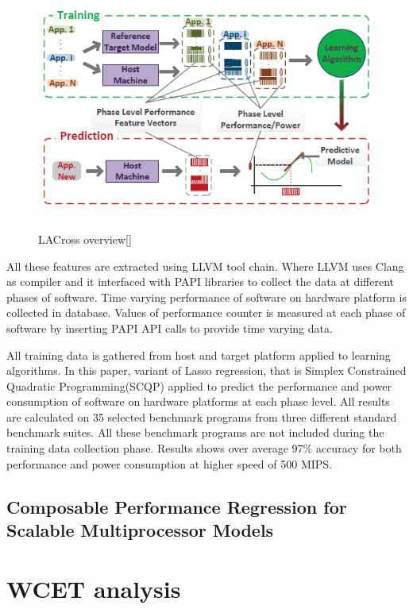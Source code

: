 \begin{figure}[h!]
\includegraphics[width=12cm, height=8cm]{./images/ieee2}
\centering
\caption{LACross overview[]}
\label{fig:paper2}
\end{figure}

\par All these features are extracted using LLVM tool chain. Where LLVM uses Clang as compiler and it interfaced with PAPI libraries to collect the data at different phases of software. Time varying performance of software on hardware platform is collected in database. Values of performance counter is measured at each phase of software by inserting PAPI API calls to provide time varying data. 

\par All training data is gathered from host and target platform applied to learning algorithms. In this paper, variant of Lasso regression, that is Simplex Constrained Quadratic Programming(SCQP) applied to predict the performance and power consumption of software on hardware platforms at each phase level. All results are calculated on 
35 selected benchmark programs from three different standard benchmark suites. All these benchmark programs are not included during the training data collection phase. 
Results shows over average 97\% accuracy for both performance and power consumption at higher speed of 500 MIPS. 

\subsection{Composable Performance Regression for Scalable Multiprocessor Models}

\section{WCET analysis}
